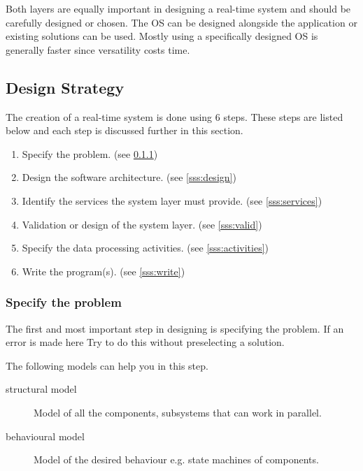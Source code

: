 \documentclass[../main.tex]{subfiles}
\begin{document}
Both layers are equally important in designing a real-time system and should be carefully designed or chosen.
The OS can be designed alongside the application or existing solutions can be used. 
Mostly using a specifically designed OS is generally faster since versatility costs time.

\subsection{Design Strategy}
The creation of a real-time system is done using 6 steps. These steps are listed below and each step is discussed further in this section. 
\begin{enumerate}
	\item Specify the problem. (see \ref{sss:specify_problem})
	\item Design the software architecture. (see \ref{sss:design})
	\item Identify the services the system layer must provide. (see \ref{sss:services})
	\item Validation or design of the system layer. (see \ref{sss:valid})
	\item Specify the data processing activities. (see \ref{sss:activities})
	\item Write the program(s). (see \ref{sss:write})
\end{enumerate}

\subsubsection{Specify the problem}
\label{sss:specify_problem}
The first and most important step in designing is specifying the problem. 
If an error is made here 
Try to do this without preselecting a solution.

The following models can help you in this step.
\begin{description}
	\item[structural model] Model of all the components, subsystems that can work in parallel.
	\item[behavioural model] Model of the desired behaviour e.g. state machines of components. 
\end{description}
\end{document}
